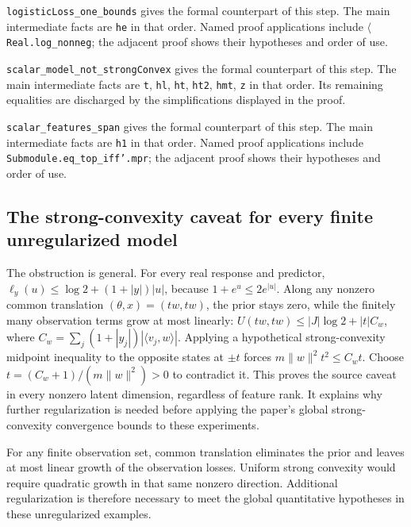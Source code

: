 \documentclass[11pt,a4paper]{report}
\begin{document}
\begin{leanbox}
\texttt{logistic\allowbreak{}Loss\_\allowbreak{}one\_\allowbreak{}bounds} gives the formal counterpart of this step. The main intermediate facts are \texttt{he} in that order. Named proof applications include \texttt{\ensuremath{\langle}Real.\allowbreak{}log\_\allowbreak{}nonneg}; the adjacent proof shows their hypotheses and order of use.




\texttt{scalar\_\allowbreak{}model\_\allowbreak{}not\_\allowbreak{}strong\allowbreak{}Convex} gives the formal counterpart of this step. The main intermediate facts are \texttt{t}, \texttt{hl}, \texttt{ht}, \texttt{ht2}, \texttt{hmt}, \texttt{z} in that order. Its remaining equalities are discharged by the simplifications displayed in the proof.




\texttt{scalar\_\allowbreak{}features\_\allowbreak{}span} gives the formal counterpart of this step. The main intermediate facts are \texttt{h1} in that order. Named proof applications include \texttt{Submodule.\allowbreak{}eq\_\allowbreak{}top\_\allowbreak{}iff'.\allowbreak{}mpr}; the adjacent proof shows their hypotheses and order of use.
\end{leanbox}
\subsection{\texorpdfstring{The strong-convexity caveat for every finite unregularized model}{The strong-convexity caveat for every finite unregularized model}}
\label{report-step-KIPLMC-LogisticExample-lean-9}


The obstruction is general. For every real response and predictor, \(\ell_y(u)\le\log2+(1+|y|)|u|\), because \(1+e^u\le2e^{|u|}\). Along any nonzero common translation \((\theta,x)=(tw,tw)\), the prior stays zero, while the finitely many observation terms grow at most linearly: \(U(tw,tw)\le|J|\log2+|t|C_w\), where \(C_w=\sum_j(1+|y_j|)|\langle v_j,w\rangle|\). Applying a hypothetical strong-convexity midpoint inequality to the opposite states at \(\pm t\) forces \(m\|w\|^2t^2\le C_wt\). Choose \(t=(C_w+1)/(m\|w\|^2)>0\) to contradict it. This proves the source caveat in every nonzero latent dimension, regardless of feature rank. It explains why further regularization is needed before applying the paper's global strong-convexity convergence bounds to these experiments.



For any finite observation set, common translation eliminates the prior and leaves at most linear growth of the observation losses. Uniform strong convexity would require quadratic growth in that same nonzero direction. Additional regularization is therefore necessary to meet the global quantitative hypotheses in these unregularized examples.
\end{document}
